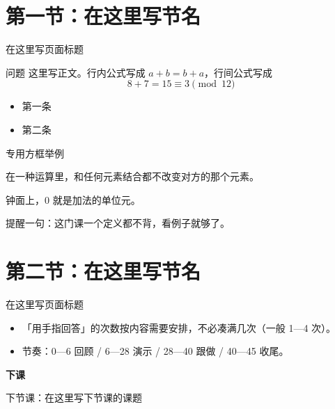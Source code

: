 \section{第一节：在这里写节名}

\begin{frame}{在这里写页面标题}
  \begin{block}{问题}
    这里写正文。行内公式写成 \(a+b=b+a\)，行间公式写成
    \[
      8+7=15\equiv 3 \pmod{12}
    \]
  \end{block}

  \begin{itemize}
    \item 第一条
    \item 第二条
  \end{itemize}

\end{frame}

\begin{frame}{专用方框举例}
  \begin{definition}[单位元]
    在一种运算里，和任何元素结合都不改变对方的那个元素。
  \end{definition}

  \begin{example}
    钟面上，\(0\) 就是加法的单位元。
  \end{example}

  \begin{zhu}
    提醒一句：这门课一个定义都不背，看例子就够了。
  \end{zhu}
\end{frame}

\section{第二节：在这里写节名}

\begin{frame}{在这里写页面标题}
  \begin{itemize}
    \item 「用手指回答」的次数按内容需要安排，不必凑满几次（一般 1—4 次）。
    \item 节奏：0—6 回顾 / 6—28 演示 / 28—40 跟做 / 40—45 收尾。
  \end{itemize}
\end{frame}

\begin{frame}
  \begin{center}
    \vspace{1.6cm}
    {\Large\textcolor{textgreen}{\bfseries 下课}}

    \vspace{1.0cm}
    {\large\textcolor{accentgreen}{下节课：在这里写下节课的课题}}
  \end{center}
\end{frame}

